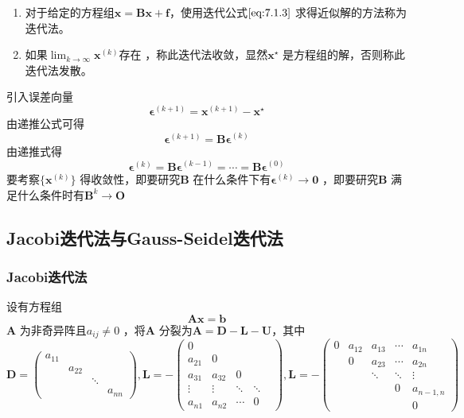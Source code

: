 \documentclass[a4paper]{article}
\begin{document}
\begin{definition}
	\begin{enumerate}
		\item 对于给定的方程组$\mathbf{x} = \mathbf{Bx + f}$，使用迭代公式$\ref{eq:7.1.3}$ 求得近似解的方法称为迭代法。
		\item 如果$\lim_{k \to \infty} \mathbf{x}^{(k)}$存在 ，称此迭代法收敛，显然$\mathbf{x}^{\star}$ 是方程组的解，否则称此迭代法发散。
	\end{enumerate}
\end{definition}

引入误差向量
\[
\mathbf{\epsilon}^{(k+1)} = \mathbf{x}^{(k+1)} - \mathbf{x}^{\star}
\] 
由递推公式可得
\[
\mathbf{\epsilon}^{(k+1)} = \mathbf{B \epsilon}^{(k)}
\] 
由递推式得
\[
\mathbf{\epsilon}^{(k)} = \mathbf{B \epsilon}^{(k-1)} = \cdots = \mathbf{B \epsilon}^{(0)}
\] 
要考察$\{ \mathbf{x}^{(k)}\} $ 得收敛性，即要研究$\mathbf{B}$ 在什么条件下有$\mathbf{\epsilon}^{(k)} \to \mathbf{0}$ ，即要研究$\mathbf{B}$ 满足什么条件时有$\mathbf{B}^{k} \to \mathbf{O}$ 

\subsection{Jacobi迭代法与Gauss-Seidel迭代法}
\subsubsection{Jacobi迭代法}
设有方程组\[
\mathbf{Ax = b} \tag{7.2.1} \label{eq:7.2.1} 
\] 
$\mathbf{A}$ 为非奇异阵且$a_{ij} \neq 0$ ，将$\mathbf{A}$ 分裂为$\mathbf{A = D - L - U}$，其中
\[
\mathbf{D} = \begin{pmatrix} 
	a_{11} & & & \\
	       & a_{22} & & \\
	       & & \ddots & \\
	       & & & a_{nn}
\end{pmatrix} ,
\mathbf{L} = - \begin{pmatrix} 
	0 & & & &\\
	a_{21} & 0 & & & \\
	a_{31} & a_{32} & 0 & & \\
	\vdots & \vdots & \ddots & \ddots & \\
	a_{n1} & a_{n2} & \cdots & 0
\end{pmatrix} ,
\mathbf{L} = -\begin{pmatrix} 
	0 & a_{12} & a_{13} & \cdots & a_{1n} \\
	  & 0 & a_{23} & \cdots & a_{2n} \\
	  & & \ddots & \ddots & \vdots \\
	  & & & 0 & a_{n-1,n} \\
	  & & & & 0
\end{pmatrix} 
\] 
\end{document}
